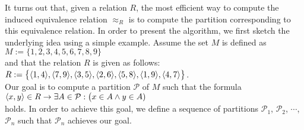 It turns out that, given a relation $R$, the most efficient way to compute the induced equivalence
relation $\approx_R$ is to compute the partition corresponding to this equivalence relation.  In
order to present the algorithm, we first sketch the underlying idea using a simple example.  Assume
the set $M$ is defined as
\\[0.2cm]
\hspace*{1.3cm}
$M := \{ 1,2,3,4,5,6,7,8,9 \}$
\\[0.2cm]
and that the relation $R$ is given as follows:
\\[0.2cm]
\hspace*{1.3cm}
$R := \bigl\{ \pair(1,4), \pair(7,9), \pair(3,5), \pair(2,6), \pair(5,8), \pair(1,9), \pair(4,7) \bigr\}$.
\\[0.2cm]
Our goal is to compute a partition $\mathcal{P}$ of $M$ such that the formula
\\[0.2cm]
\hspace*{1.3cm}
$\pair(x, y) \in R \rightarrow \exists A \in \mathcal{P}:\bigl(x \in A \wedge y \in A)$
\\[0.2cm]
holds.  In order to achieve this goal, we define a sequence of partitions $\mathcal{P}_1$,
$\mathcal{P}_2$, $\cdots$, $\mathcal{P}_n$ such that $\mathcal{P}_n$ achieves our goal.
